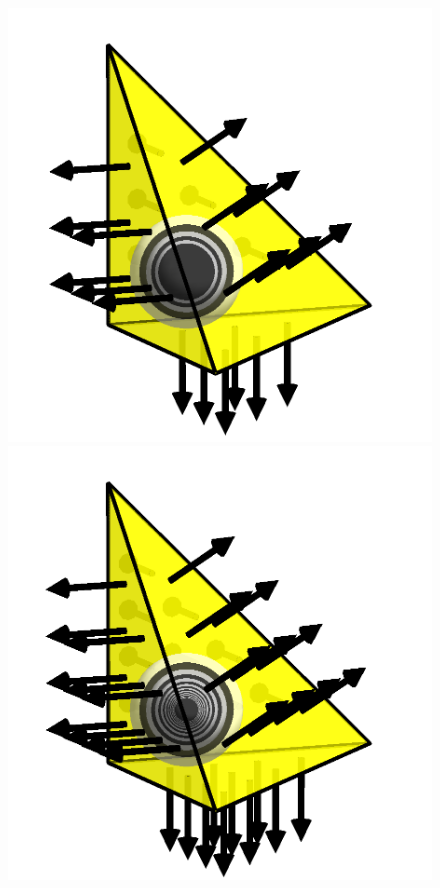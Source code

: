 \begin{figure}[t!]
  \includegraphics[width=\threefigs]{chapters/kirby-6/png/BDM2_3d.png}
  \includegraphics[width=\threefigs]{chapters/kirby-6/png/BDM3_3d.png}

\end{figure}
